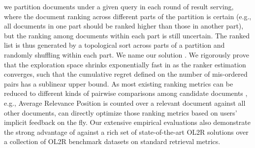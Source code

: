 we partition documents under a given query in each round of result serving, where the document ranking across different parts of the partition is certain (e.g., all documents in one part should be ranked higher than those in another part), but the ranking among documents within each part is still uncertain.
The ranked list is thus generated by a topological sort across parts of a partition and randomly shuffling within each part. We name our solution \model{}.
We rigorously prove that the exploration space shrinks exponentially fast in \model{} as the ranker estimation converges, such that the cumulative regret defined on the number of mis-ordered pairs has a sublinear upper bound. As most existing ranking metrics can be reduced to different kinds of pairwise comparisons among candidate documents \cite{Wang2018Lambdaloss}, e.g., Average Relevance Position is counted over a relevant document against all other documents, \model{} can directly optimize those ranking metrics based on users' implicit feedback on the fly. Our extensive empirical evaluations also demonstrate the strong advantage of \model{} against a rich set of state-of-the-art OL2R solutions over a collection of OL2R benchmark datasets on standard retrieval metrics.  
